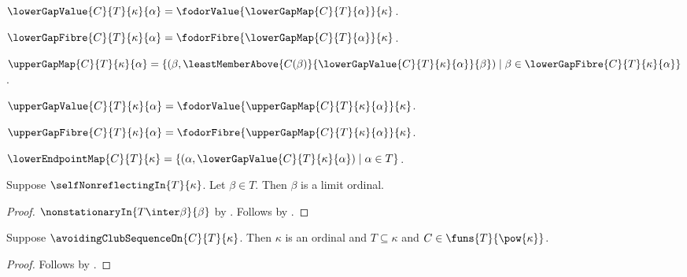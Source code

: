 \begin{definition}\label{lower_gap_value}
    $\lowerGapValue{C}{T}{\kappa}{\alpha}
        =\fodorValue{\lowerGapMap{C}{T}{\alpha}}{\kappa}$.
\end{definition}

\begin{definition}\label{lower_gap_fibre}
    $\lowerGapFibre{C}{T}{\kappa}{\alpha}
        =\fodorFibre{\lowerGapMap{C}{T}{\alpha}}{\kappa}$.
\end{definition}

\begin{definition}\label{upper_gap_map}
    $\upperGapMap{C}{T}{\kappa}{\alpha}
        =\{(\beta,\leastMemberAbove{C(\beta)}
                {\lowerGapValue{C}{T}{\kappa}{\alpha}}{\beta})
            \mid \beta\in\lowerGapFibre{C}{T}{\kappa}{\alpha}\}$.
\end{definition}

\begin{definition}\label{upper_gap_value}
    $\upperGapValue{C}{T}{\kappa}{\alpha}
        =\fodorValue{\upperGapMap{C}{T}{\kappa}{\alpha}}{\kappa}$.
\end{definition}

\begin{definition}\label{upper_gap_fibre}
    $\upperGapFibre{C}{T}{\kappa}{\alpha}
        =\fodorFibre{\upperGapMap{C}{T}{\kappa}{\alpha}}{\kappa}$.
\end{definition}

\begin{definition}\label{lower_endpoint_map}
    $\lowerEndpointMap{C}{T}{\kappa}
        =\{(\alpha,\lowerGapValue{C}{T}{\kappa}{\alpha})
            \mid \alpha\in T\}$.
\end{definition}

\begin{proposition}\label{self_nonreflecting_points_are_limits}
    Suppose $\selfNonreflectingIn{T}{\kappa}$.
    Let $\beta\in T$.
    Then $\beta$ is a limit ordinal.
\end{proposition}
\begin{proof}
    $\nonstationaryIn{T\inter\beta}{\beta}$
        by .
    Follows by .
\end{proof}

\begin{proposition}\label{avoiding_club_sequence_on_type}
    Suppose $\avoidingClubSequenceOn{C}{T}{\kappa}$.
    Then $\kappa$ is an ordinal and $T\subseteq\kappa$ and
        $C\in\funs{T}{\pow{\kappa}}$.
\end{proposition}
\begin{proof}
    Follows by .
\end{proof}

